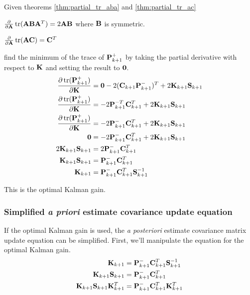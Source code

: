 Given theorems \ref{thm:partial_tr_aba} and \ref{thm:partial_tr_ac}
\begin{theorem}
  \label{thm:partial_tr_aba}

  $\frac{\partial}{\partial\mathbf{A}}\operatorname{tr}(\mathbf{A}\mathbf{B}\mathbf{A}^T) =
    2\mathbf{A}\mathbf{B}$ where $\mathbf{B}$ is symmetric.
\end{theorem}
\begin{theorem}
  \label{thm:partial_tr_ac}

  $\frac{\partial}{\partial\mathbf{A}}\operatorname{tr}(\mathbf{A}\mathbf{C}) = \mathbf{C}^T$
\end{theorem}

find the minimum of the trace of $\mathbf{P}_{k+1}^+$ by taking the partial
derivative with respect to $\mathbf{K}$ and setting the result to $\mathbf{0}$.
\begin{align*}
  \frac{\partial\operatorname{tr}(\mathbf{P}_{k+1}^+)}{\partial\mathbf{K}} &=
    \mathbf{0} - 2(\mathbf{C}_{k+1}\mathbf{P}_{k+1}^-)^T + 2\mathbf{K}_{k+1}\mathbf{S}_{k+1} \\
  \frac{\partial\operatorname{tr}(\mathbf{P}_{k+1}^+)}{\partial\mathbf{K}} &=
    -2\mathbf{P}_{k+1}^{-T}\mathbf{C}_{k+1}^T + 2\mathbf{K}_{k+1}\mathbf{S}_{k+1} \\
  \frac{\partial\operatorname{tr}(\mathbf{P}_{k+1}^+)}{\partial\mathbf{K}} &=
    -2\mathbf{P}_{k+1}^-\mathbf{C}_{k+1}^T + 2\mathbf{K}_{k+1}\mathbf{S}_{k+1} \\
  \mathbf{0} &= -2\mathbf{P}_{k+1}^-\mathbf{C}_{k+1}^T + 2\mathbf{K}_{k+1}\mathbf{S}_{k+1} \\
  2\mathbf{K}_{k+1}\mathbf{S}_{k+1} &= 2\mathbf{P}_{k+1}^-\mathbf{C}_{k+1}^T \\
  \mathbf{K}_{k+1}\mathbf{S}_{k+1} &= \mathbf{P}_{k+1}^-\mathbf{C}_{k+1}^T \\
  \mathbf{K}_{k+1} &= \mathbf{P}_{k+1}^-\mathbf{C}_{k+1}^T\mathbf{S}_{k+1}^{-1}
\end{align*}

This is the optimal Kalman gain.

\subsubsection{Simplified \textit{a priori} estimate covariance update equation}

If the optimal Kalman gain is used, the \textit{a posteriori} estimate
covariance matrix update equation can be simplified. First, we'll manipulate the
equation for the optimal Kalman gain.
\begin{align*}
  \mathbf{K}_{k+1} &= \mathbf{P}_{k+1}^-\mathbf{C}_{k+1}^T\mathbf{S}_{k+1}^{-1} \\
  \mathbf{K}_{k+1}\mathbf{S}_{k+1} &= \mathbf{P}_{k+1}^-\mathbf{C}_{k+1}^T \\
  \mathbf{K}_{k+1}\mathbf{S}_{k+1}\mathbf{K}_{k+1}^T &=
    \mathbf{P}_{k+1}^-\mathbf{C}_{k+1}^T\mathbf{K}_{k+1}^T
\end{align*}

